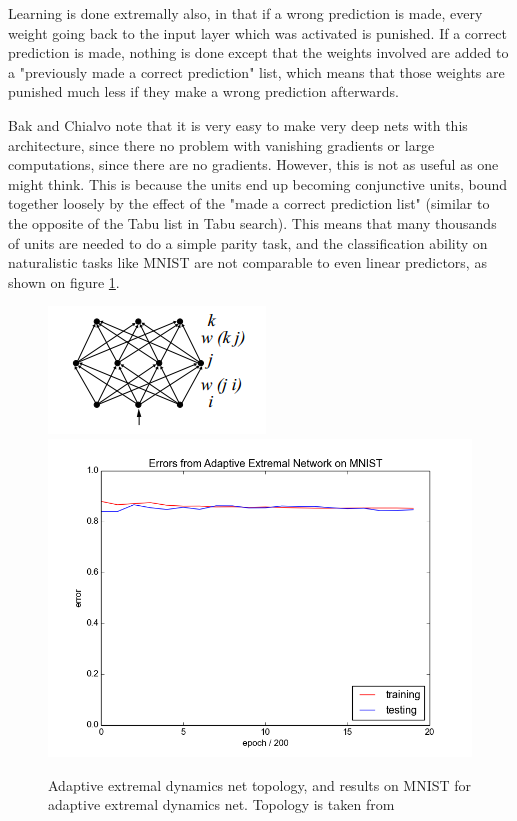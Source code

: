 \documentclass[12pt]{article}
\begin{document}
Learning is done extremally also, in that if a wrong prediction is made, every weight going back to the input layer which was activated is punished. If a correct prediction is made, nothing is done except that the weights involved are added to a "previously made a correct prediction" list, which means that those weights are punished much less if they make a wrong prediction afterwards.

Bak and Chialvo note that it is very easy to make very deep nets with this architecture, since there no problem with vanishing gradients or large computations, since there are no gradients. However, this is not as useful as one might think. This is because the units end up becoming conjunctive units, bound together loosely by the effect of the "made a correct prediction list" (similar to the opposite of the Tabu list in Tabu search\cite{tabu}). This means that many thousands of units are needed to do a simple parity task, and the classification ability on naturalistic tasks like MNIST are not comparable to even linear predictors, as shown on figure \ref{fig:baknet_res}.

\begin{figure}
  \includegraphics{bak_chialvo_net_topology}
  \includegraphics{bak_plot}
  \label{fig:baknet_res}
  \caption{Adaptive extremal dynamics net topology, and results on MNIST for adaptive extremal dynamics net. Topology is taken from \cite{bakchialvo}}
\end{figure}
\end{document}
